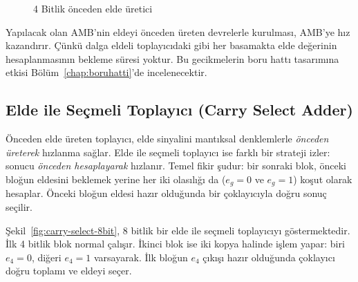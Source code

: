 \begin{figure}[htbp]
\caption{4 Bitlik {\"o}nceden elde {\"u}retici}
\label{fig:4bit-onceden-elde}
\end{figure}

Yapılacak olan AMB'nin eldeyi önceden üreten devrelerle kurulması, AMB'ye hız kazandırır. Çünkü dalga eldeli toplayıcıdaki gibi her basamakta elde değerinin hesaplanmasının bekleme süresi yoktur. Bu gecikmelerin boru hattı tasarımına etkisi Bölüm~\ref{chap:boruhatti}'de incelenecektir.

\subsection{Elde ile Seçmeli Toplayıcı (Carry Select Adder)}
\label{sec:carry-select}

Önceden elde üreten toplayıcı, elde sinyalini mantıksal denklemlerle \emph{önceden üreterek} hızlanma sağlar. Elde ile seçmeli toplayıcı ise farklı bir strateji izler: sonucu \emph{önceden hesaplayarak} hızlanır. Temel fikir şudur: bir sonraki blok, önceki bloğun eldesini beklemek yerine her iki olasılığı da ($e_{g} = 0$ ve $e_{g} = 1$) koşut olarak hesaplar. Önceki bloğun eldesi hazır olduğunda bir çoklayıcıyla doğru sonuç seçilir.

Şekil~\ref{fig:carry-select-8bit}, 8 bitlik bir elde ile seçmeli toplayıcıyı göstermektedir. İlk 4 bitlik blok normal çalışır. İkinci blok ise iki kopya halinde işlem yapar: biri $e_4 = 0$, diğeri $e_4 = 1$ varsayarak. İlk bloğun $e_4$ çıkışı hazır olduğunda çoklayıcı doğru toplamı ve eldeyi seçer.

